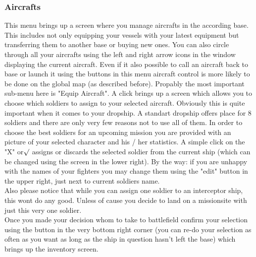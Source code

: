 \subsubsection{Aircrafts}
This menu brings up a screen where you manage aircrafts in the according base. This includes not only equipping your vessels with your latest equipment but transferring them to another base or buying new ones. You can also circle through all your aircrafts using the left and right arrow icons in the window displaying the current aircraft. Even if it also possible to call an aircraft back to base or launch it using the buttons in this menu aircraft control is more likely to be done on the global map (as described before).
Propably the most important sub-menu here is "Equip Aircraft".  A click brings up a screen which allows you to choose which soldiers to assign to your selected aircraft. Obviously this is quite important when it comes to your dropship. A standart dropship offers place for 8 soldiers and there are only very few reasons not to use all of them. In order to choose the best soldiers for an upcoming mission you are provided with an picture of your selected character and his / her statistics. A simple click on the "X" or$\surd$ assigns or discards the selected soldier from the current ship (which can be changed using the screen in the lower right). By the way: if you are unhappy with the names of your fighters you may change them using the "edit" button in the upper right, just next to current soldiers name.\\
Also please notice that while you can assign one soldier to an interceptor ship, this wont do any good. Unless of cause you decide to land on a missionsite with just this very one soldier.\\
Once you made your decision whom to take to battlefield confirm your selection using the button in the very bottom right corner (you can re-do your selection as often as you want as long as the ship in question hasn't left the base) which brings up the inventory screen.

